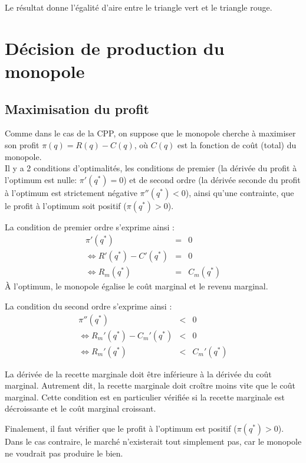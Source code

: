 \documentclass[
]{book}
\theoremstyle{definition}
\theoremstyle{definition}
\theoremstyle{definition}
\theoremstyle{definition}
\theoremstyle{remark}
\begin{document}
Le résultat donne l'égalité d'aire entre le triangle vert et le triangle rouge.

\hypertarget{duxe9cision-de-production-du-monopole}{%
\section{Décision de production du monopole}\label{duxe9cision-de-production-du-monopole}}

\hypertarget{maximisation-du-profit}{%
\subsection{Maximisation du profit}\label{maximisation-du-profit}}

Comme dans le cas de la CPP, on suppose que le monopole cherche à maximiser son profit \(\pi(q)=R(q)-C(q)\), où \(C(q)\) est la fonction de coût (total) du monopole.\\
Il y a 2 conditions d'optimalités, les conditions de premier (la dérivée du profit à l'optimum est nulle: \(\pi'(q^*)=0\)) et de second ordre (la dérivée seconde du profit à l'optimum est strictement négative \(\pi''(q^*)<0\)), ainsi qu'une contrainte, que le profit à l'optimum soit positif (\(\pi(q^*)>0\)).

La condition de premier ordre s'exprime ainsi :
\[
\begin{array}{rcl}
\pi'(q^*) &=&0\\
\Leftrightarrow R'(q^*) - C'(q^*) &=& 0\\
\Leftrightarrow R_m(q^*) &=&C_m(q^*) 
\end{array}
\]
À l'optimum, le monopole égalise le coût marginal et le revenu marginal.

La condition du second ordre s'exprime ainsi :
\[
\begin{array}{rcl}
\pi''(q^*) &<&0\\
\Leftrightarrow R_m'(q^*) - C_m'(q^*) &<& 0\\
\Leftrightarrow R_m'(q^*) &<& C_m'(q^*)
\end{array}
\]

La dérivée de la recette marginale doit être inférieure à la dérivée du coût marginal.
Autrement dit, la recette marginale doit croître moins vite que le coût marginal.
Cette condition est en particulier vérifiée si la recette marginale est décroissante et le coût marginal croissant.

Finalement, il faut vérifier que le profit à l'optimum est positif (\(\pi(q^*)>0\)).
Dans le cas contraire, le marché n'existerait tout simplement pas, car le monopole ne voudrait pas produire le bien.
\end{document}
